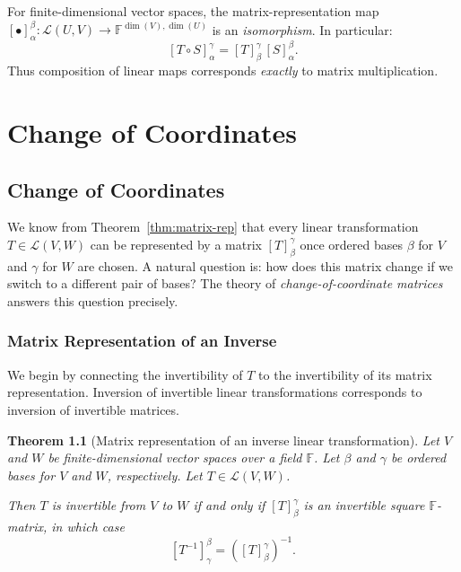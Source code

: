 \documentclass[11pt, a4paper, notitlepage]{report}
\newtheorem{theorem}{Theorem}[section]
\theoremstyle{definition}
\theoremstyle{remark}
\begin{document}
\begin{keyresult}[title={Key Result: The Fundamental Theorem}]
For finite-dimensional vector spaces, the matrix-representation map
$[\bullet]_\alpha^\beta \colon \mathcal{L}(U,V) \to \mathbb{F}^{\dim(V),\dim(U)}$
is an \emph{isomorphism}.  In particular:
\[
  [T \circ S]_\alpha^\gamma = [T]_\beta^\gamma\,[S]_\alpha^\beta.
\]
Thus composition of linear maps corresponds \emph{exactly} to matrix multiplication.
\end{keyresult}

\chapter{Change of Coordinates}
\label{chap:week7}

\section{Change of Coordinates}
\label{sec:change-of-coords}

We know from Theorem~\ref{thm:matrix-rep} that every linear transformation $T \in
\mathcal{L}(V,W)$ can be represented by a matrix $[T]_\beta^\gamma$ once ordered bases
$\beta$ for $V$ and $\gamma$ for $W$ are chosen.  A natural question is: how does this
matrix change if we switch to a different pair of bases?  The theory of
\emph{change-of-coordinate matrices} answers this question precisely.

\subsection{Matrix Representation of an Inverse}

We begin by connecting the invertibility of $T$ to the invertibility of its matrix
representation.  Inversion of invertible linear transformations corresponds to inversion
of invertible matrices.

\begin{theorem}[Matrix representation of an inverse linear transformation]
\label{thm:matrix-rep-inverse}
Let $V$ and $W$ be finite-dimensional vector spaces over a field $\mathbb{F}$.  Let
$\beta$ and $\gamma$ be ordered bases for $V$ and $W$, respectively.  Let
$T \in \mathcal{L}(V,W)$.

Then $T$ is invertible from $V$ to $W$ if and only if $[T]_\beta^\gamma$ is an invertible
square $\mathbb{F}$-matrix, in which case
\[
  \left[T^{-1}\right]_\gamma^\beta = \left([T]_\beta^\gamma\right)^{-1}.
\]
\end{theorem}
\end{document}
